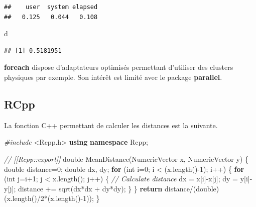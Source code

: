 \documentclass[
  12pt,
  french,
  a4paper,
  extrafontsizes,onecolumn,openright
  ]{memoir}
\newenvironment{Shaded}{\begin{snugshade}}{\end{snugshade}}
\newcommand{\CommentTok}[1]{\textcolor[rgb]{0.56,0.35,0.01}{\textit{#1}}}
\newcommand{\ControlFlowTok}[1]{\textcolor[rgb]{0.13,0.29,0.53}{\textbf{#1}}}
\newcommand{\DataTypeTok}[1]{\textcolor[rgb]{0.13,0.29,0.53}{#1}}
\newcommand{\DecValTok}[1]{\textcolor[rgb]{0.00,0.00,0.81}{#1}}
\newcommand{\ImportTok}[1]{#1}
\newcommand{\KeywordTok}[1]{\textcolor[rgb]{0.13,0.29,0.53}{\textbf{#1}}}
\newcommand{\NormalTok}[1]{#1}
\newcommand{\PreprocessorTok}[1]{\textcolor[rgb]{0.56,0.35,0.01}{\textit{#1}}}
\begin{document}
\begin{verbatim}
##    user  system elapsed 
##   0.125   0.044   0.108
\end{verbatim}

\begin{Shaded}
\begin{Highlighting}[]
\NormalTok{d}
\end{Highlighting}
\end{Shaded}

\begin{verbatim}
## [1] 0.5181951
\end{verbatim}

\normalsize

\textbf{foreach} dispose d'adaptateurs optimisés permettant d'utiliser des clusters physiques par exemple.
Son intérêt est limité avec le package \textbf{parallel}.

\hypertarget{rcpp}{%
\subsection{RCpp}\label{rcpp}}

La fonction C++ permettant de calculer les distances est la suivante.

\scriptsize

\begin{Shaded}
\begin{Highlighting}[]
\PreprocessorTok{#include }\ImportTok{<Rcpp.h>}
\KeywordTok{using} \KeywordTok{namespace}\NormalTok{ Rcpp;}

\CommentTok{// [[Rcpp::export]]}
\DataTypeTok{double}\NormalTok{ MeanDistance(NumericVector x, NumericVector y) \{}
  \DataTypeTok{double}\NormalTok{ distance=}\DecValTok{0}\NormalTok{;}
  \DataTypeTok{double}\NormalTok{ dx, dy;}
  \ControlFlowTok{for}\NormalTok{ (}\DataTypeTok{int}\NormalTok{ i=}\DecValTok{0}\NormalTok{; i < (x.length()-}\DecValTok{1}\NormalTok{); i++) \{}
    \ControlFlowTok{for}\NormalTok{ (}\DataTypeTok{int}\NormalTok{ j=i+}\DecValTok{1}\NormalTok{; j < x.length(); j++) \{}
    \CommentTok{// Calculate distance}
\NormalTok{        dx = x[i]-x[j];}
\NormalTok{        dy = y[i]-y[j];}
\NormalTok{        distance += sqrt(dx*dx + dy*dy);}
\NormalTok{    \}}
\NormalTok{  \}}
  \ControlFlowTok{return}\NormalTok{ distance/(}\DataTypeTok{double}\NormalTok{)(x.length()/}\DecValTok{2}\NormalTok{*(x.length()-}\DecValTok{1}\NormalTok{));}
\NormalTok{\}}
\end{Highlighting}
\end{Shaded}
\end{document}
